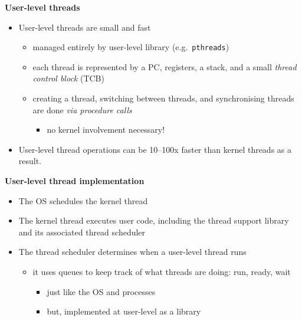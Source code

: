 \documentclass[11pt,a4paper]{article}
\begin{document}
\textbf{User-level threads}
\begin{itemize}
    \item User-level threads are small and fast
        \begin{itemize}
            \item managed entirely by user-level library (e.g.\ \texttt{pthreads})
            \item each thread is represented by a PC, registers, a stack, and a small
                \emph{thread control block} (TCB)
            \item creating a thread, switching between threads, and synchronising
                threads are done \emph{via procedure calls}
                \begin{itemize}
                    \item no kernel involvement necessary!
                \end{itemize}
        \end{itemize}
    \item User-level thread operations can be 10--100x faster than kernel threads as a result.
\end{itemize}

\textbf{User-level thread implementation}
\begin{itemize}
    \item The OS schedules the kernel thread
    \item The kernel thread executes user code, including the thread support library
        and its associated thread scheduler
    \item The thread scheduler determines when a user-level thread runs
        \begin{itemize}
            \item it uses queues to keep track of what threads are doing: run, ready, wait
                \begin{itemize}
                    \item just like the OS and processes
                    \item but, implemented at user-level as a library
                \end{itemize}
        \end{itemize}
\end{itemize}
\end{document}
